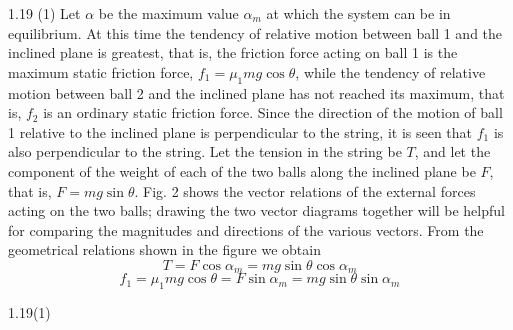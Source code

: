 \begin{solution}{1.19}
(1) Let $\alpha$ be the maximum value $\alpha_m$ at which the system can be in equilibrium. At this time the tendency of relative motion between ball 1 and the inclined plane is greatest, that is, the friction force acting on ball 1 is the maximum static friction force, $f_1=\mu_1mg\cos\theta$, while the tendency of relative motion between ball 2 and the inclined plane has not reached its maximum, that is, $f_2$ is an ordinary static friction force. Since the direction of the motion of ball 1 relative to the inclined plane is perpendicular to the string, it is seen that $f_1$ is also perpendicular to the string. Let the tension in the string be $T$, and let the component of the weight of each of the two balls along the inclined plane be $F$, that is, $F=mg\sin\theta$. Fig. 2 shows the vector relations of the external forces acting on the two balls; drawing the two vector diagrams together will be helpful for comparing the magnitudes and directions of the various vectors. From the geometrical relations shown in the figure we obtain
\begin{equation}
T=F\cos\alpha_m=mg\sin\theta\cos\alpha_m \tag{1}
\end{equation}
\begin{equation}
f_1=\mu_1mg\cos\theta=F\sin\alpha_m=mg\sin\theta\sin\alpha_m \tag{2}
\end{equation}

\begin{figbox}{1.19(1)}
\end{figbox}


\end{solution}
